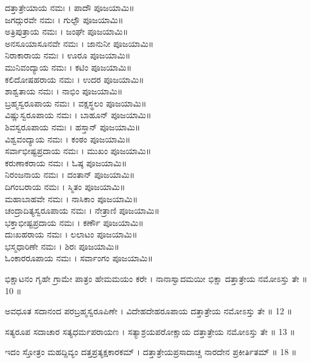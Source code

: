ದತ್ತಾತ್ರೇಯಾಯ ನಮಃ । ಪಾದೌ ಪೂಜಯಾಮಿ॥\\
ಜಗದ್ಗುರವೇ ನಮಃ । ಗುಲ್ಫೌ ಪೂಜಯಾಮಿ॥\\
ಅತ್ರಿಪುತ್ರಾಯ ನಮಃ । ಜಂಘೇ ಪೂಜಯಾಮಿ॥\\
ಅನಸೂಯಾಸೂನವೇ ನಮಃ । ಜಾನುನೀ ಪೂಜಯಾಮಿ॥\\
ನಿರಾಕಾರಾಯ ನಮಃ । ಊರೂ ಪೂಜಯಾಮಿ॥\\
ಮುನಿವಂದ್ಯಾಯ ನಮಃ । ಕಟಿಂ ಪೂಜಯಾಮಿ॥\\
ಕಲಿದೋಷಹರಾಯ ನಮಃ । ಉದರ ಪೂಜಯಾಮಿ॥\\
ಶಾಶ್ವತಾಯ ನಮಃ । ನಾಭಿಂ ಪೂಜಯಾಮಿ॥\\
ಬ್ರಹ್ಮಸ್ವರೂಪಾಯ ನಮಃ । ವಕ್ಷಸ್ಥಲಂ ಪೂಜಯಾಮಿ॥\\
ವಿಷ್ಣುಸ್ವರೂಪಾಯ ನಮಃ । ಬಾಹೂನ್ ಪೂಜಯಾಮಿ॥\\
ಶಿವಸ್ವರೂಪಾಯ ನಮಃ । ಹಸ್ತಾನ್ ಪೂಜಯಾಮಿ॥\\
ವಿಶ್ವವಂದ್ಯಾಯ ನಮಃ । ಕಂಠಂ ಪೂಜಯಾಮಿ॥\\
ಸರ್ವಾಭೀಷ್ಟಪ್ರದಾಯ ನಮಃ । ಮುಖಂ ಪೂಜಯಾಮಿ॥\\
ಕರುಣಾಕರಾಯ ನಮಃ । ಓಷ್ಠ ಪೂಜಯಾಮಿ॥\\
ನಿರಂಜನಾಯ ನಮಃ । ದಂತಾನ್ ಪೂಜಯಾಮಿ॥\\
ದಿಗಂಬರಾಯ ನಮಃ । ಸ್ಮಿತಂ ಪೂಜಯಾಮಿ॥\\
ಮಹಾಬಾಹವೇ ನಮಃ । ನಾಸಿಕಾಂ ಪೂಜಯಾಮಿ॥\\
ಚಂದ್ರಾದಿತ್ಯಸ್ವರೂಪಾಯ ನಮಃ । ನೇತ್ರಾಣಿ ಪೂಜಯಾಮಿ॥\\
ಭಕ್ತಾಭೀಷ್ಟಪ್ರದಾಯ ನಮಃ । ಕರ್ಣೌ ಪೂಜಯಾಮಿ॥\\
ದುಃಖಹರಾಯ ನಮಃ । ಲಲಾಟಂ ಪೂಜಯಾಮಿ॥\\
ಭಸ್ಮಧಾರಿಣೇ ನಮಃ । ಶಿರಃ ಪೂಜಯಾಮಿ॥\\
ಓಂಕಾರರೂಪಾಯ ನಮಃ । ಸರ್ವಾಂಗಂ ಪೂಜಯಾಮಿ॥




ಭಿಕ್ಷಾಟನಂ ಗೃಹೇ ಗ್ರಾಮೇ ಪಾತ್ರಂ ಹೇಮಮಯಂ ಕರೇ ।
ನಾನಾಸ್ವಾದಮಯೀ ಭಿಕ್ಷಾ ದತ್ತಾತ್ರೇಯ ನಮೋಽಸ್ತು ತೇ ॥ 10 ॥

ಅವಧೂತ ಸದಾನಂದ ಪರಬ್ರಹ್ಮಸ್ವರೂಪಿಣೇ ।
ವಿದೇಹದೇಹರೂಪಾಯ ದತ್ತಾತ್ರೇಯ ನಮೋಽಸ್ತು ತೇ ॥ 12 ॥

ಸತ್ಯರೂಪ ಸದಾಚಾರ ಸತ್ಯಧರ್ಮಪರಾಯಣ ।
ಸತ್ಯಾಶ್ರಯಪರೋಕ್ಷಾಯ ದತ್ತಾತ್ರೇಯ ನಮೋಽಸ್ತು ತೇ ॥ 13 ॥

ಇದಂ ಸ್ತೋತ್ರಂ ಮಹದ್ದಿವ್ಯಂ ದತ್ತಪ್ರತ್ಯಕ್ಷಕಾರಕಮ್ ।
ದತ್ತಾತ್ರೇಯಪ್ರಸಾದಾಚ್ಚ ನಾರದೇನ ಪ್ರಕೀರ್ತಿತಮ್ ॥ 18 ॥ 
 



